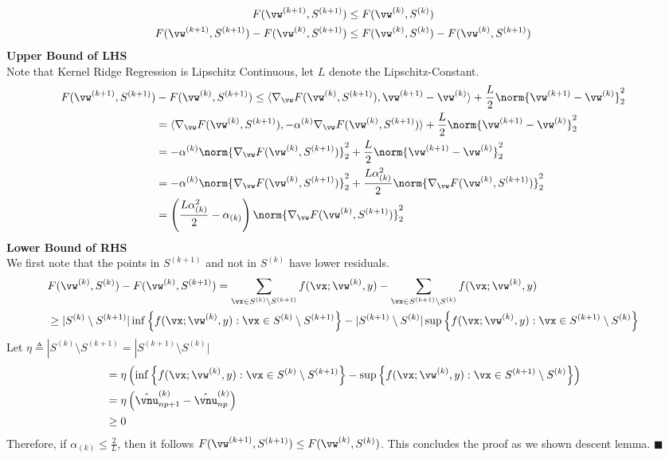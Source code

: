 \documentclass{article} %
\theoremstyle{plain}
\theoremstyle{definition}
\theoremstyle{remark}
\begin{document}
\begin{appendices}
	\begin{align}
		F(\vw^{(k+1)},S^{(k+1)}) &\leq F(\vw^{(k)},S^{(k)}) &&\\
		F(\vw^{(k+1)},S^{(k+1)}) - F(\vw^{(k)}, S^{(k+1)})  &\leq F(\vw^{(k)}, S^{(k)}) - F(\vw^{(k)},S^{(k+1)}) &&
	\end{align}
	\textbf{Upper Bound of LHS}\\
	Note that Kernel Ridge Regression is Lipschitz Continuous, let $L$ denote the Lipschitz-Constant.
	\begin{align}
		F(\vw^{(k+1)},S^{(k+1)}) &- F(\vw^{(k)},S^{(k+1)})\leq \langle \nabla_\vw F(\vw^{(k)},S^{(k+1)}), \vw^{(k+1)} - \vw^{(k)}\rangle + \frac{L}{2}\norm{\vw^{(k+1)} - \vw^{(k)}}_2^2 &&\\
		&= \langle \nabla_\vw F(\vw^{(k)},S^{(k+1)}), -\alpha^{(k)}\nabla_\vw F(\vw^{(k)},S^{(k+1)})\rangle + \frac{L}{2}\norm{\vw^{(k+1)} - \vw^{(k)}}_2^2 &&\\
		&= -\alpha^{(k)}\norm{\nabla_\vw F(\vw^{(k)},S^{(k+1)})}_2^2 + \frac{L}{2}\norm{\vw^{(k+1)} - \vw^{(k)}}_2^2 &&\\
		&= -\alpha^{(k)}\norm{\nabla_\vw F(\vw^{(k)},S^{(k+1)})}_2^2 + \frac{L \alpha_{(k)}^2}{2}\norm{\nabla_\vw F(\vw^{(k)},S^{(k+1)})}_2^2 &&\\
		&= \left(\frac{L\alpha_{(k)}^2}{2} - \alpha_{(k)}\right) \norm{\nabla_\vw F(\vw^{(k)},S^{(k+1)})}_2^2 &&
	\end{align}
	\textbf{Lower Bound of RHS}\\
	We first note that the points in $S^{(k+1)}$ and not in $S^{(k)}$ have lower residuals.
	\begin{align}
		&F(\vw^{(k)}, S^{(k)}) - F(\vw^{(k)}, S^{(k+1)}) = \sum_{\vx \in S^{(k)} \setminus S^{(k+1)}} f(\vx;\vw^{(k)},y) - \sum_{\vx \in S^{(k+1)} \setminus S^{(k)}} f(\vx;\vw^{(k)},y)&&\\
		&\geq |S^{(k)}\setminus S^{(k+1)}|\inf\left\{f(\vx;\vw^{(k)},y): \vx \in S^{(k)}\setminus S^{(k+1)}\right\} - |S^{(k+1)}\setminus S^{(k)}|\sup\left\{f(\vx;\vw^{(k)},y):\vx \in S^{(k+1)} \setminus S^{(k)}\right\}&&
	\end{align}	
	Let $\eta \triangleq |S^{(k)} \setminus S^{(k+1)} = |S^{(k+1)} \setminus S^{(k)}|$
	\begin{align}
		&= \eta \left(\inf\left\{f(\vx;\vw^{(k)},y): \vx \in S^{(k)}\setminus S^{(k+1)}\right\} - \sup\left\{f(\vx;\vw^{(k)},y):\vx \in S^{(k+1)} \setminus S^{(k)}\right\}\right) &&\\
		&= \eta\left(\hat{\vnu}^{(k)}_{np+1} - \hat{\vnu}^{(k)}_{np}\right) &&\\
		&\geq 0&&
	\end{align}
	Therefore, if $ \alpha_{(k)} \leq \frac{2}{L}$, then it follows $ F(\vw^{(k+1)},S^{(k+1)}) \leq F(\vw^{(k)},S^{(k)})$.
	This concludes the proof as we shown descent lemma.
	\hfill $\blacksquare$
	

\end{appendices}
\end{document}
